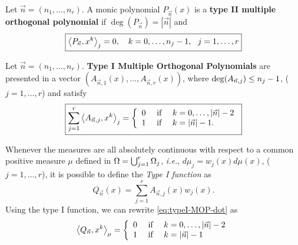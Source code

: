 \documentclass[portrait,final,a0paper,fontscale=0.38]{baposter}
\begin{document}
\begin{poster}
{\begin{multicols}{2}
    \begin{definition}
      Let $\vec n = (n_1,\dots,n_r)$. A monic polynomial $P_{\vec n}(x)$ is a \textbf{type II multiple orthogonal polynomial} if $\deg(P_{\vec n})= |\vec n|$ and 
      \begin{equation}
        \label{eq:typeII-MOP-dot}
        \boxed{\left\langle P_{\vec n} , x^k \right\rangle_j = 0, \ \ \ k=0,\dots,n_{j}-1, \ \ j = 1,\dots,r}
    \end{equation}
  \end{definition}
  \begin{definition}
    \label{def:typeI-univar}
    Let $\vec n = (n_1,\dots,n_r)$. \textbf{Type I Multiple Orthogonal Polynomials} are presented in a vector $(A_{\vec n, 1}(x), \dots, A_{\vec n, r}(x))$, where $\deg(A_{\vec n, j})\leq\nolinebreak n_j-1$, ($j=1,\dots,r$) and satisfy
    \begin{equation}
      \label{eq:typeI-MOP-dot}
      \boxed{\sum_{j=1}^r \left\langle A_{\vec n,j} , x^k \right\rangle_j = \left\{\begin{array}{ccl}
          0 &   \text{ if } & k=0,\dots,|\vec n|-2 \\
          1 & \text{ if } & k=|\vec n|-1.      
      \end{array}\right.}
    \end{equation}
  \end{definition}
  Whenever the measures are all absolutely continuous with respect to a common positive measure $\mu$ defined in $\Omega =\nolinebreak \bigcup_{j=1}^r \Omega_j$, \textit{i.e.}, $d\mu_j = w_j(x) d\mu(x)$, ($j=1,\dots,r$), it is possible to define the \textit{Type I function} as
  \begin{equation}
      \label{eq:typeI-function}
      Q_{\vec n}(x)=\sum_{j=1}^r A_{\vec n,j}(x)w_j(x).
  \end{equation}
  Using the type I function, we can rewrite \eqref{eq:typeI-MOP-dot} as
  \begin{equation}
      \label{eq:typeI-MOP-function}
      \left\langle Q_{\vec n} , x^k \right\rangle_\mu = \left\{\begin{array}{ccl}
          0 &   \text{ if } & k=0,\dots,|\vec n|-2 \\
          1 & \text{ if } & k=|\vec n|-1      
      \end{array}\right.
  \end{equation}
  \end{multicols}
	}
%
%
{

}
\end{poster}
\end{document}
